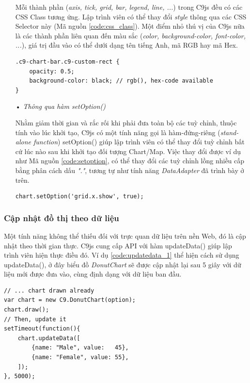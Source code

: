 \documentclass[12pt,a4paper]{article}
\begin{document}
\begin{itemize}
Mỗi thành phần (\textit{axis, tick, grid, bar, legend, line, ...}) trong C9js đều có các CSS Class\citep{css_class} tương ứng. Lập trình viên có thể thay đổi \textit{style} thông qua các CSS Selector này (Mã nguồn \ref{code:css_class}). Một điểm nhỏ thú vị của C9js nữa là các thành phần liên quan đến màu sắc (\textit{color, background-color, font-color, ...}), giá trị đầu vào có thể dưới dạng tên tiếng Anh, mã RGB hay mã Hex.

\begin{lstlisting}[caption=Thay đổi \textit{style} bằng CSS Selector, label={code:css_class}]
.c9-chart-bar.c9-custom-rect {
    opacity: 0.5;
    background-color: black; // rgb(), hex-code available
}
\end{lstlisting}

\item[•] \emph{Thông qua hàm \textsf{setOption()}}

Nhằm giảm thời gian và rắc rối khi phải đưa toàn bộ các tuỳ chỉnh, thuộc tính vào lúc khởi tạo, C9js có một tính năng gọi là hàm-đứng-riêng (\textit{stand-alone function}) \textsf{setOption()} giúp lập trình viên có thể thay đổi tuỳ chỉnh bất cứ lúc nào sau khi khởi tạo đối tượng Chart/Map. Việc thay đổi được ví dụ như Mã nguồn \ref{code:setoption}, có thể thay đổi các tuỳ chỉnh lồng nhiều cấp bằng phân cách dấu \textit{"."}, tương tự như tính năng \textit{DataAdapter} đã trình bày ở trên.

\begin{lstlisting}[caption=Thay đổi \textit{style} với \textsf{setOption()}, label={code:setoption}]
chart.setOption('grid.x.show', true);
\end{lstlisting}

\end{itemize}

\subsubsection{Cập nhật đồ thị theo dữ liệu}
Một tính năng không thể thiếu đối với trực quan dữ liệu trên nền Web, đó là cập nhật theo thời gian thực. C9js cung cấp API với hàm \textsf{updateData()} giúp lập trình viên hiện thực điều đó. Ví dụ \ref{code:updatedata_1} thể hiện cách sử dụng \textsf{updateData()}, ở đây biểu đồ \textit{DonutChart} sẽ được cập nhật lại sau 5 giây với dữ liệu mới được đưa vào, cùng định dạng với dữ liệu ban đầu.

\begin{lstlisting}[caption=Cập nhật lại biểu đồ với \textit{updateData}, label={code:updatedata_1}]
// ... chart drawn already
var chart = new C9.DonutChart(option);
chart.draw();
// Then, update it
setTimeout(function(){
    chart.updateData([
        {name: "Male", value:   45},
        {name: "Female", value: 55},
    ]);
}, 5000);
\end{lstlisting}
\end{document}
